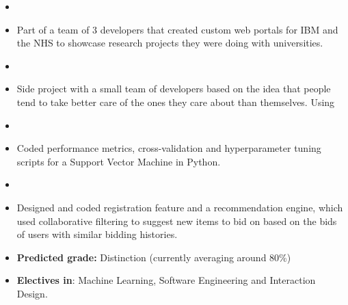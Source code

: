 \documentclass[10pt,a4paper,ragged2e]{altacv}
\begin{document}
\begin{itemize}
    \item[]      
    \smallskip
    \item Part of a team of 3 developers that created custom web portals for IBM and the NHS to showcase research projects they were doing with universities. 
\end{itemize}
\divider

\begin{itemize}
    \item[]   
    \smallskip
    \item Side project with a small team of developers based on the idea that people tend to take better care of the ones they care about than themselves. Using 
\end{itemize}
\divider

\begin{itemize}
\item[]         
\smallskip
\item Coded performance metrics, cross-validation and hyperparameter tuning scripts for a Support Vector Machine in Python. 
\end{itemize}
\divider

\begin{itemize}
    \item[]       
    \smallskip
    \item Designed and coded registration feature and a recommendation engine, which used collaborative filtering to suggest new items to bid on based on the bids of users with similar bidding histories. 
\end{itemize}

\begin{itemize}
    \item \textbf{Predicted grade:} Distinction (currently averaging around 80\%)
    \item \textbf{Electives in}: Machine Learning, Software Engineering and Interaction Design. 
\end{itemize}
\divider
\end{document}
